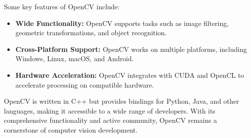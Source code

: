 Some key features of OpenCV include:
\begin{itemize}
\item \textbf{Wide Functionality:} OpenCV supports tasks such as image filtering, geometric transformations, and object recognition.
\item \textbf{Cross-Platform Support:} OpenCV works on multiple platforms, including Windows, Linux, macOS, and Android.
\item \textbf{Hardware Acceleration:} OpenCV integrates with CUDA and OpenCL to accelerate processing on compatible hardware.
\end{itemize}

OpenCV is written in C++ but provides bindings for Python, Java, and other languages, making it accessible to a wide range of developers. With its comprehensive functionality and active community, OpenCV remains a cornerstone of computer vision development.

